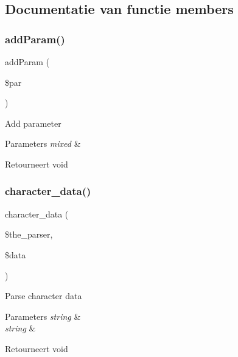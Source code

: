 \subsection{Documentatie van functie members}
\mbox{\label{class_x_m_l___r_p_c___message_a8000e3ae75e90052e5ee10febb9ce2d0}} 
\subsubsection{\texorpdfstring{addParam()}{addParam()}}
{\footnotesize\ttfamily add\+Param (\begin{DoxyParamCaption}\item[{}]{\$par }\end{DoxyParamCaption})}

Add parameter


\begin{DoxyParams}{Parameters}
{\em mixed} & \\
\hline
\end{DoxyParams}
\begin{DoxyReturn}{Retourneert}
void 
\end{DoxyReturn}
\mbox{\label{class_x_m_l___r_p_c___message_ae10d173fc93c23cb233ff01acb2afbe2}} 
\subsubsection{\texorpdfstring{character\_data()}{character\_data()}}
{\footnotesize\ttfamily character\+\_\+data (\begin{DoxyParamCaption}\item[{}]{\$the\+\_\+parser,  }\item[{}]{\$data }\end{DoxyParamCaption})}

Parse character data


\begin{DoxyParams}{Parameters}
{\em string} & \\
\hline
{\em string} & \\
\hline
\end{DoxyParams}
\begin{DoxyReturn}{Retourneert}
void 
\end{DoxyReturn}
\mbox{\label{class_x_m_l___r_p_c___message_a6f0fbd9812fbf30516fa22d5743d9e89}} 
